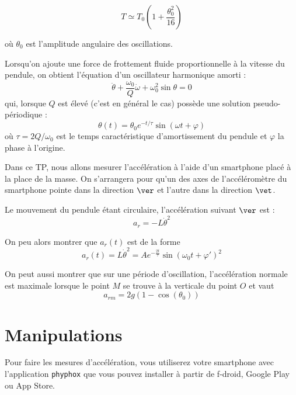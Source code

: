 \documentclass[a4paper]{tp}
\begin{document}
\begin{equation}
 T\simeq T_0 \left(1+\frac{\theta_0^2}{16}\right)
 \label{eq:borda}
\end{equation}

où $\theta_0$ est l'amplitude angulaire des oscillations.

Lorsqu'on ajoute une force de frottement fluide proportionnelle à la vitesse du pendule, on obtient l'équation d'un oscillateur harmonique amorti :
\begin{equation*}
\ddot{\theta} + \frac{\omega_0}{Q}\dot{\omega} + \omega_0^2 \sin\theta = 0
\end{equation*}
qui, lorsque $Q$ est élevé (c'est en général le cas) possède une solution pseudo-périodique :
\begin{equation*}
\theta(t) = \theta_0e^{-t/\tau}\sin(\omega t + \varphi)
\end{equation*}
où $\tau=2Q/\omega_0$ est le temps caractéristique d'amortissement du pendule et $\varphi$ la phase à l'origine.

Dans ce TP, nous allons mesurer l'accélération à l'aide d'un smartphone placé à la place de la masse. On s'arrangera pour qu'un des axes de l'accéléromètre du smartphone pointe dans la direction $\ver$ et l'autre dans la direction $\vet$.   

Le mouvement du pendule étant circulaire, l'accélération suivant $\ver$ est :
\begin{equation}
  a_r = -L \dot{\theta}^2 
\end{equation}

On peu alors montrer que $a_r(t)$ est de la forme
\begin{equation}
  a_r(t) = L \dot{\theta}^2 = A e^{-\frac{2t}{\tau}}\sin(\omega_0t + \varphi')^2
\end{equation}

On peut aussi montrer que sur une période d'oscillation, l'accélération normale est maximale lorsque le point $M$ se trouve à la verticale du point $O$ et vaut
\begin{equation}
  a_{rm} = 2g(1-\cos(\theta_0))
\end{equation}

\section{Manipulations}%
\label{sec:manipulations}

Pour faire les mesures d'accélération, vous utiliserez votre smartphone avec l'application \texttt{phyphox} que vous pouvez installer à partir de f-droid, Google Play ou App Store. 
\end{document}
